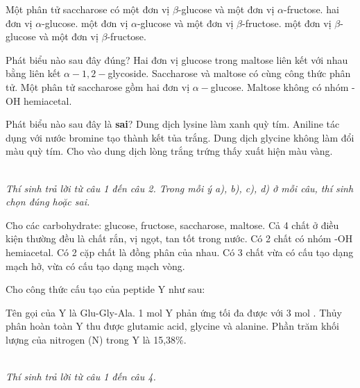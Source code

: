 \documentclass[11pt,a4paper]{article}
\begin{document}
\begin{ex}
Một phân tử saccharose có
\choice
{một đơn vị $\beta$-glucose và một đơn vị $\alpha$-fructose.}
{hai đơn vị $\alpha$-glucose.}
{một đơn vị $\alpha$-glucose và một đơn vị $\beta$-fructose.}
{một đơn vị $\beta$-glucose và một đơn vị $\beta$-fructose.}
\loigiai{}
\end{ex}
\begin{ex}
Phát biểu nào sau đây đúng?
\choice
{Hai đơn vị glucose trong maltose liên kết với nhau bằng liên kết $\alpha-1,2-$glycoside.}
{Saccharose và maltose có cùng công thức phân tử.}
{Một phân tử saccharose gồm hai đơn vị $\alpha-$glucose.}
{Maltose không có nhóm -OH hemiacetal.}
\loigiai{}
\end{ex}
\begin{ex}
Phát biểu nào sau đây là \textbf{sai}?
\choice
{Dung dịch lysine làm xanh quỳ tím.}
{Aniline tác dụng với nước bromine tạo thành kết tủa trắng.}
{Dung dịch glycine không làm đổi màu quỳ tím.}
{Cho  vào dung dịch lòng trắng trứng thấy xuất hiện màu vàng.}
\loigiai{}
\end{ex}

\vspace{6pt}
 \\
\textit{Thí sinh trả lời từ câu 1 đến câu 2. Trong mỗi ý a), b), c), d) ở mỗi câu, thí sinh chọn đúng hoặc sai.}
\vspace{4pt}

\begin{ex}
Cho các carbohydrate: glucose, fructose, saccharose, maltose.
\choiceTF
\True Cả 4 chất ở điều kiện thường đều là chất rắn, vị ngọt, tan tốt trong nước.
\True Có 2 chất có nhóm -OH hemiacetal.
\True Có 2 cặp chất là đồng phân của nhau.
\True Có 3 chất vừa có cấu tạo dạng mạch hở, vừa có cấu tạo dạng mạch vòng.
\loigiai{}
\end{ex}

\begin{ex}
Cho công thức cấu tạo của peptide Y như sau:\\
\centerline{}
\choiceTF
\True Tên gọi của Y là Glu-Gly-Ala.
1 mol Y phản ứng tối đa được với 3 mol .
\True Thủy phân hoàn toàn Y thu được glutamic acid, glycine và alanine.
Phần trăm khối lượng của nitrogen (N) trong Y là 15,38\%.
\loigiai{}
\end{ex}

\vspace{6pt}
 \\
\textit{Thí sinh trả lời từ câu 1 đến câu 4.}
\vspace{4pt}
\end{document}
